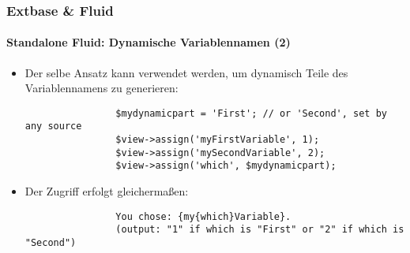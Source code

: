 \begin{frame}[fragile]
	\frametitle{Extbase \& Fluid}
	\framesubtitle{Standalone Fluid: Dynamische Variablennamen (2)}

	\lstset{basicstyle=\tiny\ttfamily}

	\begin{itemize}

		\item Der selbe Ansatz kann verwendet werden, um dynamisch Teile des Variablennamens zu generieren:

			\begin{lstlisting}
				$mydynamicpart = 'First'; // or 'Second', set by any source
				$view->assign('myFirstVariable', 1);
				$view->assign('mySecondVariable', 2);
				$view->assign('which', $mydynamicpart);
			\end{lstlisting}

		\item Der Zugriff erfolgt gleichermaßen:

			\begin{lstlisting}
				You chose: {my{which}Variable}.
				(output: "1" if which is "First" or "2" if which is "Second")
			\end{lstlisting}

	\end{itemize}

\end{frame}


